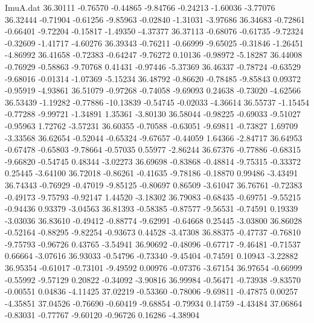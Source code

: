 \begin{filecontents}{ImuA.dat}
  36.30111   -0.76570   -0.44865   -9.84766   -0.24213   -1.60036   -3.77076
  36.32444   -0.71904   -0.61256   -9.85963   -0.02840   -1.31031   -3.97686
  36.34683   -0.72861   -0.66401   -9.72204   -0.15817   -1.49350   -4.37377
  36.37113   -0.68076   -0.61735   -9.72324   -0.32609   -1.41717   -4.60276
  36.39343   -0.76211   -0.66999   -9.65025   -0.31846   -1.26451   -4.86992
  36.41658   -0.72383   -0.64247   -9.76272    0.10136   -0.98972   -5.18287
  36.44008   -0.76929   -0.58863   -9.70768    0.41431   -0.97446   -5.37369
  36.46337   -0.78724   -0.63529   -9.68016   -0.01314   -1.07369   -5.15234
  36.48792   -0.86620   -0.78485   -9.85843    0.09372   -0.95919   -4.93861
  36.51079   -0.97268   -0.74058   -9.69093    0.24638   -0.73020   -4.62566
  36.53439   -1.19282   -0.77886  -10.13839   -0.54745   -0.02033   -4.36614
  36.55737   -1.15454   -0.77288   -9.99721   -1.34891    1.35361   -3.80130
  36.58044   -0.98225   -0.69033   -9.51027   -0.95963    1.72762   -3.57231
  36.60355   -0.70588   -0.63051   -9.69811   -0.73827    1.69709   -3.33568
  36.62654   -0.52044   -0.65324   -9.67657   -0.44059    1.64366   -2.84717
  36.64953   -0.67478   -0.65803   -9.78664   -0.57035    0.55977   -2.86244
  36.67376   -0.77886   -0.68315   -9.66820   -0.54745    0.48344   -3.02273
  36.69698   -0.83868   -0.48814   -9.75315   -0.33372    0.25445   -3.64100
  36.72018   -0.86261   -0.41635   -9.78186   -0.18870    0.99486   -3.43491
  36.74343   -0.76929   -0.47019   -9.85125   -0.80697    0.86509   -3.61047
  36.76761   -0.72383   -0.49173   -9.75793   -0.92147    1.44520   -3.18302
  36.79083   -0.68435   -0.69751   -9.55215   -0.94436    0.93379   -3.04563
  36.81393   -0.58385   -0.87577   -9.56531   -0.74591    0.19339   -3.03036
  36.83610   -0.49412   -0.88774   -9.62991   -0.64668    0.25445   -3.03800
  36.86028   -0.52164   -0.88295   -9.82254   -0.93673    0.44528   -3.47308
  36.88375   -0.47737   -0.76810   -9.75793   -0.96726    0.43765   -3.54941
  36.90692   -0.48096   -0.67717   -9.46481   -0.71537    0.66664   -3.07616
  36.93033   -0.54796   -0.73340   -9.45404   -0.74591    0.10943   -3.22882
  36.95354   -0.61017   -0.73101   -9.49592    0.00976   -0.07376   -3.67154
  36.97654   -0.66999   -0.55992   -9.57129    0.20822   -0.34092   -3.90816
  36.99984   -0.56471   -0.73938   -9.83570   -0.00551    0.04836   -4.11425
  37.02219   -0.53360   -0.78006   -9.69811   -0.47875    0.00257   -4.35851
  37.04526   -0.76690   -0.60419   -9.68854   -0.79934    0.14759   -4.43484
  37.06864   -0.83031   -0.77767   -9.60120   -0.96726    0.16286   -4.38904

\end{filecontents}
